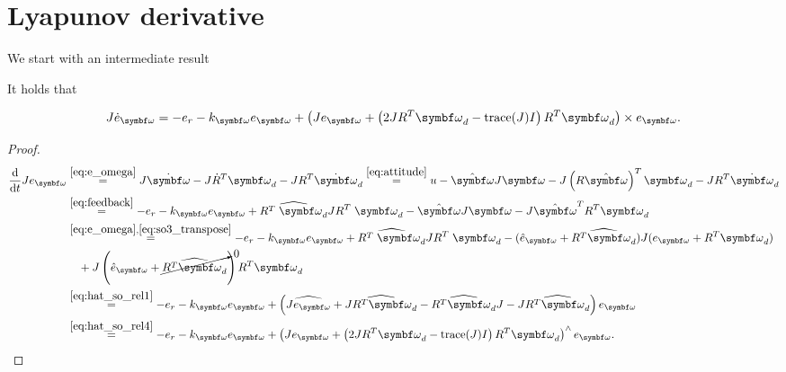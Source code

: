 \section{Lyapunov derivative}

We start with an intermediate result
\begin{proposition}
  It holds that
\end{proposition}
\begin{equation}
  \label{eq:Jeo_dot}
  J \dot e_\bomega = -e_r - k_\bomega e_\bomega + \left( J e_\bomega + \left(2 J R^T \bomega_d - \text{trace}(J) I \right) R^T \bomega_d \right) \times e_\bomega.
\end{equation}
\begin{proof}
  \begin{equation*}
    \begin{aligned}
      \frac{\mathrm{d}}{\mathrm{d}t} J e_\bomega & \overset{\eqref{eq:e_omega}}= J \dot \bomega - J \dot R^T \bomega_d - J R^T \dot \bomega_d \overset{\eqref{eq:attitude}}= u - \hat \bomega J \bomega - J \left( R \hat \bomega \right)^T \bomega_d - J R^T \dot \bomega_d \\
                                                 & \overset{\eqref{eq:feedback}}= -e_r - k_\bomega e_\bomega + \widehat{R^T \; {\bomega_d}} J R^T \; {\bomega_d} - \hat \bomega J \bomega - J \hat \bomega^T R^T \bomega_d                                                   \\
                                                 & \overset{\eqref{eq:e_omega}, \eqref{eq:so3_transpose}}= -e_r - k_\bomega e_\bomega + \widehat{R^T \; {\bomega_d}} J R^T \; {\bomega_d} - (\hat e_\bomega + \widehat{R^T \bomega_d}) J (e_\bomega + {R^T \bomega_d})       \\
                                                 & \quad + J \left( \hat e_\bomega + \cancelto{0}{\widehat{R^T \bomega_d}} \right) R^T \bomega_d                                                                                                                             \\
                                                 & \overset{\eqref{eq:hat_so_rel1}}= -e_r - k_\bomega e_\bomega + \left( \widehat{J e_\bomega} + \widehat{J R^T \bomega_d} - \widehat{R^T \bomega_d} J - J \widehat{R^T \bomega_d} \right) e_\bomega                         \\
                                                 & \overset{\eqref{eq:hat_so_rel4}}= -e_r - k_\bomega e_\bomega + \left( J e_\bomega + \left(2 J R^T \bomega_d - \text{trace}(J) I \right) R^T \bomega_d \right)^\wedge e_\bomega.
    \end{aligned}
  \end{equation*}
\end{proof}
